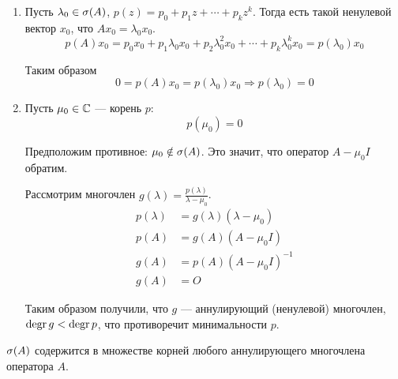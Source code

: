 \begin{proofbreak}
    \begin{enumerate}
        \item Пусть $\lambda_0 \in \operatorname{\sigma}(A)$, $p(z) = p_0 + p_1 z + \dotsb +
            p_k z^k$. Тогда есть такой ненулевой вектор
            $x_0$, что $Ax_0 = \lambda_0 x_0$.
            \[ p(A)x_0 = p_0 x_0 + p_1 \lambda_0 x_0 + p_2 \lambda_0^2 x_0 +
                \dotsb + p_k \lambda_0^k x_0 = p(\lambda_0) x_0 \]
            
            Таким образом
            \[ 0 = p(A) x_0 = p(\lambda_0) x_0 \Rightarrow p(\lambda_0) = 0 \]

        \item Пусть $\mu_0 \in \mathbb{C}$ — корень $p$:
            \[ p(\mu_0) = 0 \]

            Предположим противное: $\mu_0 \notin \operatorname{\sigma}(A)$. Это значит, что
            оператор $A - \mu_0 I$ обратим.

            Рассмотрим многочлен $g(\lambda) = \frac{p(\lambda)}{\lambda-\mu_0}$.
            \begin{align*}
                p(\lambda) &= g(\lambda)(\lambda-\mu_0) \\
                p(A) &= g(A)(A - \mu_0 I) \\
                g(A) &= p(A)(A - \mu_0 I)^{-1} \\
                g(A) &= O
            \end{align*}

            Таким образом получили, что $g$ — аннулирующий (ненулевой) многочлен, $\operatorname{degr} g <
            \operatorname{degr} p$, что противоречит минимальности $p$.
    \end{enumerate}
\end{proofbreak}

\begin{corollaryle}
    $\operatorname{\sigma}(A)$ содержится в множестве корней любого аннулирующего многочлена
    оператора $A$.
\end{corollaryle}

